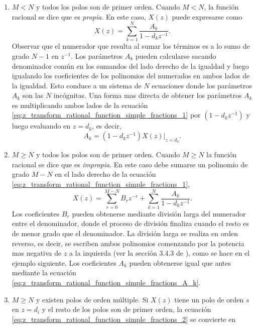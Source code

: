 \documentclass[a4paper]{report}
\begin{document}
\begin{enumerate}
 \item \(M<N\) y todos los polos son de primer orden. Cuando \(M<N\), la función racional se dice que es \emph{propia}. En este caso, \(X(z)\) puede expresarse como
 \begin{equation}\label{eq:z_transform_rational_function_simple_fractions_1}
  X(z)=\sum_{k=1}^N\frac{A_k}{1-d_kz^{-1}}.  
 \end{equation}
 Observar que el numerador que resulta al sumar los términos es a lo sumo de grado \(N-1\) en \(z^{-1}\).
 Los parámetros \(A_k\) pueden calcularse sacando denominador común en los sumandos del lado derecho de la igualdad y luego igualando los coeficientes de los polinomios del numerados en ambos lados de la igualdad. Esto conduce a un sistema de \(N\) ecuaciones donde los parámetros \(A_k\) son las \(N\) incógnitas. Una forma mas directa de obtener los parámetros \(A_k\) es multiplicando ambos lados de la ecuación \ref{eq:z_transform_rational_function_simple_fractions_1} por \((1-d_kz^{-1})\) y luego evaluando en \(z=d_k\), es decir,
 \begin{equation}\label{eq:z_transform_rational_function_simple_fractions_A_k}
  A_k=(1-d_kz^{-1})X(z)\big|_{z=d_k}.  
 \end{equation}
 \item \(M\geq N\) y todos los polos son de primer orden. Cuando \(M\geq N\) la función racional se dice que es \emph{impropia}. En este caso debe sumarse un polinomio de grado \(M-N\) en el lado derecho de la ecuación \ref{eq:z_transform_rational_function_simple_fractions_1},
 \begin{equation}\label{eq:z_transform_rational_function_simple_fractions_2}
  X(z)=\sum_{r=0}^{M-N}B_rz^{-r}+\sum_{k=1}^N\frac{A_k}{1-d_kz^{-1}}.  
 \end{equation}
 Los coeficientes \(B_r\) pueden obtenerse mediante división larga del numerador entre el denominador, donde el proceso de división finaliza cuando el resto es de menor grado que el denominador. La división larga se realiza en orden reverso, es decir, se escriben ambos polinomios comenzando por la potencia mas negativa de \(z\) a la izquierda (ver la sección 3.4.3 de \cite{proakis06digital}), como se hace en el ejemplo siguiente.
 Los coeficientes \(A_k\) pueden obtenerse igual que antes mediante la ecuación \ref{eq:z_transform_rational_function_simple_fractions_A_k}.
 \item \(M\geq N\) y existen polos de orden múltiple. Si \(X(z)\) tiene un polo de orden \(s\) en \(z=d_i\) y el resto de los polos son de primer orden, la ecuación \ref{eq:z_transform_rational_function_simple_fractions_2} se convierte en

\end{enumerate}
\end{document}
